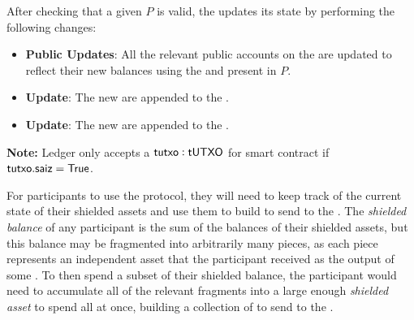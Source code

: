 \begin{definition}
    After checking that a given \TransferPost{} $P$ is valid, the \Ledger{} updates its state by performing the following changes:
    \begin{itemize}
        \item \textbf{Public Updates}: All the relevant public accounts on the \PublicLedger{} are updated to reflect their new balances using the  and  present in $P$.
        \item \textbf{\TUTXOSet{} Update}: The new  are appended to the \TUTXOSet{}.
        \item \textbf{\VoidNumberSet{} Update}: The new  are appended to the \VoidNumberSet{}.
    \end{itemize}
\end{definition}

\textbf{Note:} Ledger only accepts a ${\textsf{tutxo}}: {\textsf{tUTXO}}$ for smart contract if ${\textsf{tutxo}}.{\textsf{saiz}} = {\textsf{True}}$.



For \MantaPay{} participants to use the \Transfer{} protocol, they will need to keep track of the current state of their shielded assets and use them to build  to send to the \Ledger{}. The \emph{shielded balance} of any participant is the sum of the balances of their shielded assets, but this balance may be fragmented into arbitrarily many pieces, as each piece represents an independent asset that the participant received as the output of some \Transfer{}. To then spend a subset of their shielded balance, the participant would need to accumulate all of the relevant fragments into a large enough \emph{shielded asset} to spend all at once, building a collection of  to send to the \Ledger{}.

